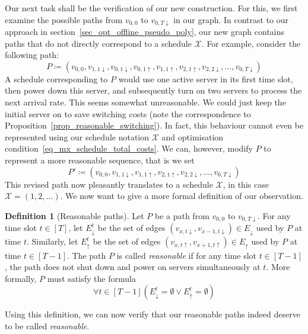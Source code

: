 \documentclass[hidelinks]{article}
\theoremstyle{plain}
\theoremstyle{definition}
\newtheorem{defn}[thm]{Definition}
\theoremstyle{rem}
\newcommand{\mx}{\mathcal{X}}
\begin{document}
Our next task shall be the verification of our new construction. For this, we first examine the possible paths from $v_{0,0}$ to $v_{0,T\downarrow}$ in our graph.
In contrast to our approach in section~\ref{sec_opt_offline_pseudo_poly}, our new graph contains paths that do not directly correspond to a schedule $\mx$. For example, consider the following path:
\begin{equation*}
	P\coloneqq(v_{0,0},v_{1,1\downarrow},v_{0,1\downarrow},v_{0,1\uparrow},v_{1,1\uparrow},v_{2,1\uparrow},v_{2,2\downarrow},\ldots,v_{0,T\downarrow})
\end{equation*}
A schedule corresponding to $P$ would use one active server in its first time slot, then power down this server, and subsequently turn on two servers to process the next arrival rate. This seems somewhat unreasonable. We could just keep the initial server on to save switching costs (note the correspondence to Proposition~\ref{prop_reasonable_switching}). In fact, this behaviour cannot even be represented using our schedule notation $\mx$ and optimisation condition~\eqref{eq_mx_schedule_total_costs}. We can, however, modify $P$ to represent a more reasonable sequence, that is we set
\begin{equation*}
	P'\coloneqq(v_{0,0},v_{1,1\downarrow},v_{1,1\uparrow},v_{2,1\uparrow},v_{2,2\downarrow},\ldots,v_{0,T\downarrow})
\end{equation*}
This revised path now pleasantly translates to a schedule $\mx$, in this case $\mx=(1,2,\ldots)$. We now want to give a more formal definition of our observation.
\begin{defn}[Reasonable paths]\label{defn_reasn_paths}
Let $P$ be a path from $v_{0,0}$ to $v_{0,T\downarrow}$. For any time slot $t\in[T]$, let $E_\downarrow^t$ be the set of edges $(v_{x,t\downarrow},v_{x-1,t\downarrow})\in E_\downarrow$ used by $P$ at time $t$. Similarly, let $E_\uparrow^t$ be the set of edges $(v_{x,t\uparrow},v_{x+1,t\uparrow})\in E_\uparrow$ used by $P$ at time $t\in[T-1]$.
The path $P$ is called \textit{reasonable} if for any time slot $t\in[T-1]$, the path does not shut down and power on servers simultaneously at $t$. More formally, $P$ must satisfy the formula
\begin{equation}
	\forall t\in[T-1]\left(E_\downarrow^t=\emptyset \lor E_\uparrow^t=\emptyset\right)\label{eq_reasn_path}
\end{equation}
\end{defn}
Using this definition, we can now verify that our reasonable paths indeed deserve to be called \textit{reasonable}.
\end{document}
